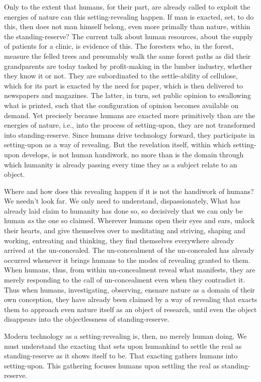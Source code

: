 \documentclass[paper=a4, fontsize=11pt,twoside]{scrartcl}
\begin{document}
Only to the extent that humans, for their part, are already called to exploit the energies of nature can this setting-revealing happen. If man is exacted, set, to do this, then does not man himself belong, even more primally than nature, within the standing-reserve? The current talk about human resources, about the supply of patients for a clinic, is evidence of this. The foresters who, in the forest, measure the felled trees and presumably walk the same forest paths as did their grandparents are today tasked by profit-making in the lumber industry, whether they know it or not. They are subordinated to the settle-ability of cellulose, which for its part is exacted by the need for paper, which is then delivered to newspapers and magazines. The latter, in turn, set public opinion to swallowing what is printed, such that the configuration of opinion becomes available on demand. Yet precisely because humans are exacted more primitively than are the energies of nature, i.e., into the process of setting-upon, they are not transformed into standing-reserve. Since humans drive technology forward, they participate in setting-upon as a way of revealing. But the revelation itself, within which setting-upon develops, is not human handiwork, no more than is the domain through which humanity is already passing every time they as a subject relate to an object.

Where and how does this revealing happen if it is not the handiwork of humans? We needn't look far. We only need to understand, dispassionately, What has already laid claim to humanity has done so, so decisively that we can only be human \textit{as} the one so claimed. Wherever humans open their eyes and ears, unlock their hearts, and give themselves over to meditating and striving, shaping and working, entreating and thinking, they find themselves everywhere already arrived at the un-concealed. The un-concealment of the un-concealed has already occurred whenever it brings humans to the modes of revealing granted to them. When humans, thus, from within un-concealment reveal what manifests, they are merely responding to the call of un-concealment even when they contradict it. Thus when humans, investigating, observing, ensnare nature as a domain of their own conception, they have already been claimed by a way of revealing that exacts them to approach even nature itself as an object of research, until even the object disappears into the objectlessness of standing-reserve.

Modern technology as a setting-revealing is, then, no merely human doing. We must understand the exacting that sets upon humankind to settle the real as standing-reserve as it shows itself to be. That exacting gathers humans into setting-upon. This gathering focuses humans upon settling the real as standing-reserve.
\end{document}
